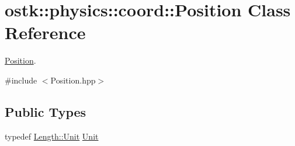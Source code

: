 \hypertarget{classostk_1_1physics_1_1coord_1_1_position}{}\section{ostk\+:\+:physics\+:\+:coord\+:\+:Position Class Reference}
\label{classostk_1_1physics_1_1coord_1_1_position}


\hyperlink{classostk_1_1physics_1_1coord_1_1_position}{Position}.  




{\ttfamily \#include $<$Position.\+hpp$>$}

\subsection*{Public Types}
\begin{DoxyCompactItemize}
\item 
typedef \hyperlink{classostk_1_1physics_1_1units_1_1_length_a2664470a7eedf5d45c88861fe69badea}{Length\+::\+Unit} \hyperlink{classostk_1_1physics_1_1coord_1_1_position_a2a02f1f2ef0d93230e25aa27f12545c0}{Unit}
\end{DoxyCompactItemize}
